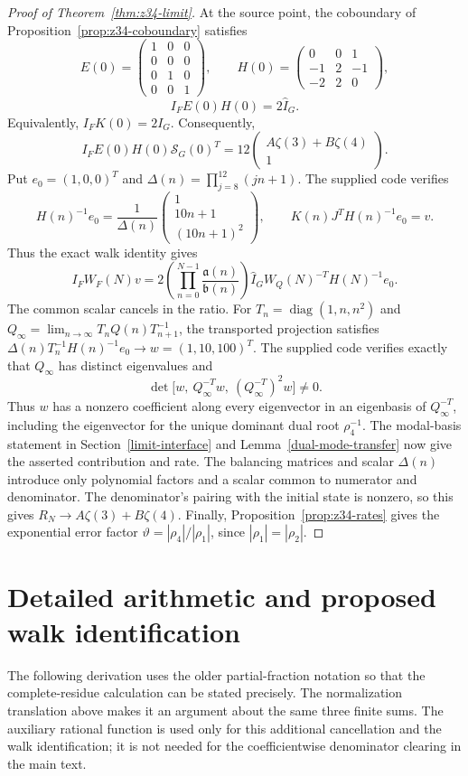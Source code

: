 \documentclass[11pt]{article}
\begin{document}
\begin{proof}[Proof of Theorem~\ref{thm:z34-limit}]
At the source point, the coboundary of
Proposition~\ref{prop:z34-coboundary} satisfies
\[
E(0)=\begin{pmatrix}1&0&0\\0&0&0\\0&1&0\\0&0&1\end{pmatrix},
\qquad H(0)=\begin{pmatrix}0&0&1\\-1&2&-1\\-2&2&0\end{pmatrix},
\]
\[
I_FE(0)H(0)=2\widehat I_G.
\]
Equivalently, $I_FK(0)=2I_G$.
Consequently,
\[
I_FE(0)H(0)\widehat{\mathcal S}_G(0)^T
=12\begin{pmatrix}A\zeta(3)+B\zeta(4)\\1\end{pmatrix}.
\]
Put $e_0=(1,0,0)^T$ and $\Delta(n)=\prod_{j=8}^{12}(jn+1)$.
The supplied code verifies
\[
H(n)^{-1}e_0=\frac{1}{\Delta(n)}
\begin{pmatrix}1\\10n+1\\(10n+1)^2\end{pmatrix},
\qquad K(n)J^TH(n)^{-1}e_0=v.
\]
Thus the exact walk identity gives
\[
I_FW_F(N)v
=2\left(\prod_{n=0}^{N-1}\frac{\mathfrak a(n)}{\mathfrak b(n)}\right)
\widehat I_G W_Q(N)^{-T}H(N)^{-1}e_0.
\]
The common scalar cancels in the ratio. For
$T_n=\operatorname{diag}(1,n,n^2)$ and
$Q_\infty=\lim_{n\to\infty}T_nQ(n)T_{n+1}^{-1}$, the transported
projection satisfies $\Delta(n)T_n^{-1}H(n)^{-1}e_0\to w=(1,10,100)^T$.
The supplied code verifies exactly that $Q_\infty$ has distinct
eigenvalues and
\[
\det\bigl[w,\ Q_\infty^{-T}w,\ (Q_\infty^{-T})^2w\bigr]\ne0.
\]
Thus $w$ has a nonzero coefficient along every eigenvector in an
eigenbasis of $Q_\infty^{-T}$, including the eigenvector for the unique
dominant dual root $\rho_4^{-1}$. The modal-basis statement in Section~\ref{limit-interface} and
Lemma~\ref{dual-mode-transfer} now give the asserted contribution and
rate. The balancing matrices and scalar $\Delta(n)$ introduce only polynomial
factors and a scalar common to numerator and denominator.
The denominator's pairing with the initial state is nonzero, so
this gives $R_N\to A\zeta(3)+B\zeta(4)$.
Finally, Proposition~\ref{prop:z34-rates} gives the exponential error
factor $\vartheta=|\rho_4|/|\rho_1|$, since $|\rho_1|=|\rho_2|$.
\end{proof}



\section*{Detailed arithmetic and proposed walk identification}
The following derivation uses the older partial-fraction notation so
that the complete-residue calculation can be stated precisely. The
normalization translation above makes it an argument about the same
three finite sums. The auxiliary rational function is used only for
this additional cancellation and the walk identification; it is not
needed for the coefficientwise denominator clearing in the main text.
\end{document}
